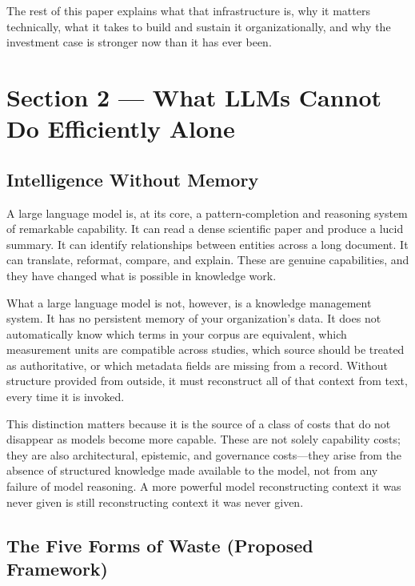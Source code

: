 \documentclass[man,12pt,donotrepeattitle]{apa7}
\begin{document}
The rest of this paper explains what that infrastructure is, why it matters
technically, what it takes to build and sustain it organizationally, and
why the investment case is stronger now than it has ever been.


\section{Section 2 --- What LLMs Cannot Do Efficiently Alone}

\subsection{Intelligence Without Memory}

A large language model is, at its core, a pattern-completion and reasoning
system of remarkable capability. It can read a dense scientific paper and
produce a lucid summary. It can identify relationships between entities
across a long document. It can translate, reformat, compare, and explain.
These are genuine capabilities, and they have changed what is possible in
knowledge work.

What a large language model is not, however, is a knowledge management
system. It has no persistent memory of your organization's data. It does
not automatically know which terms in your corpus are equivalent, which
measurement units are compatible across studies, which source should be
treated as authoritative, or which metadata fields are missing from a
record. Without structure provided from outside, it must reconstruct all
of that context from text, every time it is invoked.

This distinction matters because it is the source of a class of costs
that do not disappear as models become more capable. These are not solely
capability costs; they are also architectural, epistemic, and governance
costs---they arise from the absence of structured knowledge made available
to the model, not from any failure of model reasoning. A more powerful
model reconstructing context it was never given is still reconstructing
context it was never given.

\subsection{The Five Forms of Waste (Proposed Framework)}
\end{document}
